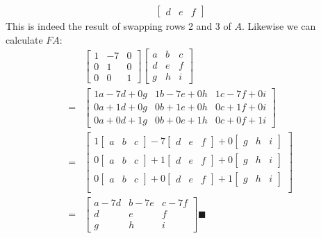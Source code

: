 \documentclass[11pt, letterpaper]{report}
\newenvironment{book}{}{}
\begin{document}
\begin{book}
\begin{align*}
\begin{bmatrix}
d & e & f
\end{bmatrix}
\end{align*}
This is indeed the result of swapping rows 2 and 3 of $A$. Likewise we can calculate $FA$:
\begin{align*}
&\begin{bmatrix}
1 & -7 & 0 \\
0 & 1 & 0 \\
0 & 0 & 1 
\end{bmatrix}\begin{bmatrix}
a & b & c \\
d & e & f \\
g & h & i
\end{bmatrix} \\
= &\begin{bmatrix}
1a  -7d + 0g & 1b -7e + 0h & 1c -7f + 0i \\
0a + 1d + 0g & 0b + 1e + 0h & 0c + 1f + 0i \\
0a + 0d + 1g & 0b + 0e + 1h & 0c + 0f + 1i 
\end{bmatrix} \\
= &\begin{bmatrix}
1 \begin{bmatrix}a & b & c\end{bmatrix} -7 \begin{bmatrix}d & e & f\end{bmatrix} + 0\begin{bmatrix}
g & h & i
\end{bmatrix} \\
0 \begin{bmatrix}a & b & c\end{bmatrix} + 1 \begin{bmatrix}d & e & f\end{bmatrix} + 0\begin{bmatrix}
g & h & i
\end{bmatrix} \\
0 \begin{bmatrix}a & b & c\end{bmatrix} + 0 \begin{bmatrix}d & e & f\end{bmatrix} + 1\begin{bmatrix}
g & h & i
\end{bmatrix} \\
\end{bmatrix} \\
= &
\begin{bmatrix}
a -7d & b - 7e & c -7f \\
d & e & f \\
g & h & i 
\end{bmatrix}\blacksquare
\end{align*}
\end{book}
\end{document}
